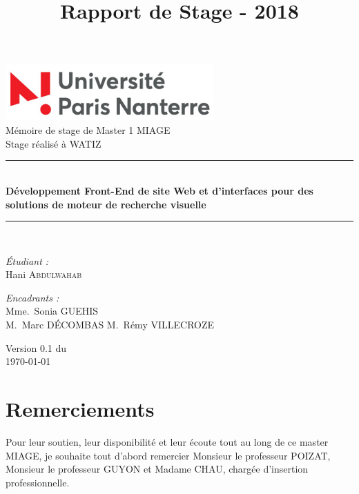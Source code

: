 \documentclass[a4paper, 12pt]{report}
\title{Rapport de Stage - 2018 }
\begin{document}

\begin{titlepage}
\begin{center}

\includegraphics[width=0.6\textwidth]{images/parisNanterre-logo}\\[1cm]

{\large Mémoire de stage de Master 1 MIAGE}\\[0.5cm]

{\large Stage réalisé à WATIZ}\\[0.5cm]

\rule{\linewidth}{0.5mm} \\[0.4cm]
{ \huge \bfseries Développement Front-End de site Web et d'interfaces pour des solutions de moteur de recherche visuelle \\[0.4cm] }
\rule{\linewidth}{0.5mm} \\[1.5cm]

\noindent
\begin{minipage}{0.4\textwidth}
  \begin{flushleft} \large
    \emph{Étudiant :}\\
    Hani \textsc{Abdulwahab}
  \end{flushleft}
\end{minipage}%
\begin{minipage}{0.4\textwidth}
  \begin{flushright} \large
    \emph{Encadrants :} \\
    Mme.~Sonia \textsc{GUEHIS}\\
    M.~Marc \textsc{DÉCOMBAS}
    M.~Rémy \textsc{VILLECROZE}
    
  \end{flushright}
\end{minipage}

\vfill

{\large Version 0.1 du\\ \today}

\end{center}
\end{titlepage}

\tableofcontents
\listoffigures
\chapter*{Remerciements}
Pour leur soutien, leur disponibilité et leur écoute tout au long de ce master MIAGE, je souhaite tout d'abord remercier Monsieur le professeur POIZAT, Monsieur le professeur GUYON et Madame CHAU, chargée d’insertion professionnelle. \\
\end{document}
